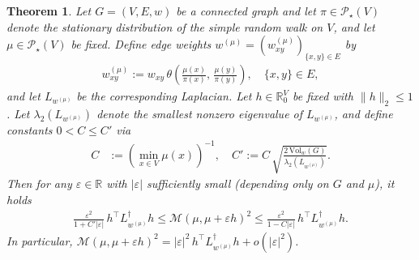 \documentclass[10pt,a4paper]{amsart}
\newtheorem{theorem}{Theorem}
\newcommand{\Maas}{\mathcal{M}}
\newcommand{\Prob}{\mathscr{P}}
\newcommand{\Vol}{\mathrm{Vol}}
\begin{document}
\begin{theorem}\label{thm:linearization-mu}
    Let $G=(V,E, w)$ be a connected graph and let $\pi\in\Prob_\star (V)$ denote the stationary distribution of the simple random walk on $V$, and let $\mu\in\Prob_\star(V)$ be fixed. Define edge weights $w^{(\mu)}=(w^{(\mu)}_{xy})_{\{x,y\}\in E}$ by
        \begin{align*}
            w^{(\mu)}_{xy} := w_{xy}\,\theta\left(\frac{\mu(x)}{\pi(x)},\,\frac{\mu(y)}{\pi(y)}\right),\quad \{x,y\}\in E,
        \end{align*}
    and let $L_{w^{(\mu)}}$ be the corresponding Laplacian. Let $h\in\mathbb{R}^{V}_0$ be fixed with $\|h\|_2\le 1$. Let $\lambda_2(L_{w^{(\mu)}})$ denote the smallest nonzero eigenvalue of $L_{w^{(\mu)}}$, and define constants $0 < C \le C'$ via
        \begin{align}\label{eq:constants-linearization}
            C &:= \left(\min_{x\in V}\mu(x)\right)^{-1},\quad C' := C\,\sqrt{\frac{2\,\Vol_w(G)}{\lambda_2(L_{w^{(\mu)}})}}.
        \end{align}
    Then for any $\varepsilon\in\mathbb{R}$ with $|\varepsilon|$ sufficiently small (depending only on $G$ and $\mu$), it holds
        \begin{align}\label{eq:main-linearization}
            \frac{\varepsilon^2}{1 + C'|\varepsilon|}\, h^\top L_{w^{(\mu)}}^\dagger h
            \le \Maas(\mu,\mu+\varepsilon h)^2
            \le \frac{\varepsilon^2}{1 - C|\varepsilon|}\, h^\top L_{w^{(\mu)}}^\dagger h.
        \end{align}
    In particular, $\Maas(\mu,\mu+\varepsilon h)^2 = |\varepsilon|^2\, h^\top L_{w^{(\mu)}}^\dagger h  + o(|\varepsilon|^2)$.
\end{theorem}
\end{document}
